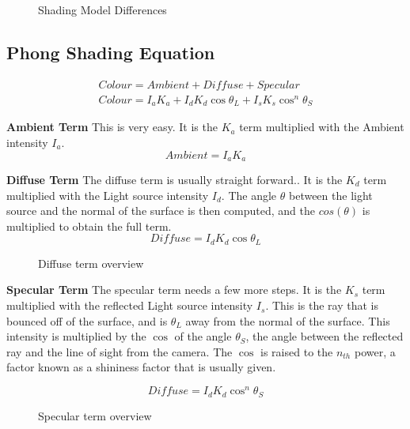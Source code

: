   \begin{figure}[!htb]
	\caption{\label{fig:normalCube} Shading Model Differences}
\end{figure}
\subsection{Phong Shading Equation}
\begin{equation}
\label{eqn:phongEqn}
\begin{split}
Colour = Ambient + Diffuse + Specular \\
Colour = I_aK_a + I_dK_d\cos{\theta_L} + I_sK_s\cos^n{\theta_S} 
\end{split}
\end{equation}

\textbf{Ambient Term}
This is very easy. It is the $K_{a}$ term multiplied with the Ambient intensity $I_{a}$.
\begin{equation}
\label{eqn:phongAmbient}
Ambient = I_aK_a
\end{equation}

\textbf{Diffuse Term}
The diffuse term is usually straight forward.. It is the $K_{d}$ term multiplied with the Light source intensity $I_{d}$. The angle $\theta$ between the light source and the normal of the surface is then computed, and the $cos(\theta)$ is multiplied to obtain the full term.
\begin{equation}
\label{eqn:phongDiffuse}
Diffuse =  I_dK_d\cos{\theta_L}
\end{equation}

\begin{figure}[!htb]
\caption{\label{fig:diffuse} Diffuse term overview}
\end{figure}

\textbf{Specular Term}
The specular term needs a few more steps. It is the $K_{s}$ term multiplied with the reflected Light source intensity $I_{s}$. This is the ray that is bounced off of the surface, and is $\theta_L$ away from the normal of the surface. This intensity is multiplied by the $\cos$ of the angle $\theta_S$, the angle between the reflected ray and the line of sight from the camera. The $\cos$ is raised to the $n_{th}$ power, a factor known as a shininess factor that is usually given.

\begin{equation}
\label{eqn:phongSpecular}
Diffuse =  I_dK_d\cos^n{\theta_S}
\end{equation}
\begin{figure}[!htb]
	\caption{\label{fig:specular} Specular term overview}
\end{figure}
\newpage

